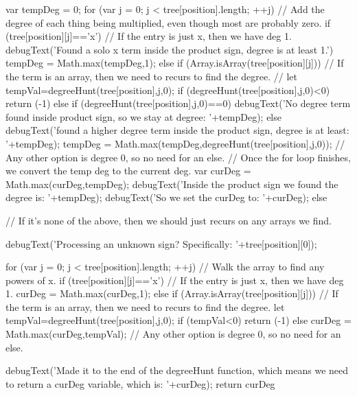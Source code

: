 \documentclass{ximera}
\begin{document}
\begin{javascript}
{{        var tempDeg = 0;
        for (var j = 0; j < tree[position].length; ++j) {
            // Add the degree of each thing being multiplied, even though most are probably zero.
            if (tree[position][j]=='x') {
                // If the entry is just x, then we have deg 1.
                debugText('Found a solo x term inside the product sign, degree is at least 1.')
                tempDeg = Math.max(tempDeg,1);
            } else if (Array.isArray(tree[position][j])) {
                // If the term is an array, then we need to recurs to find the degree.
                // let tempVal=degreeHunt(tree[position],j,0);
                if (degreeHunt(tree[position],j,0)<0) {
                    return (-1)
                } else if (degreeHunt(tree[position],j,0)==0){
                    debugText('No degree term found inside product sign, so we stay at degree: '+tempDeg);
                } else {
                    debugText('found a higher degree term inside the product sign, degree is at least: '+tempDeg);
                    tempDeg = Math.max(tempDeg,degreeHunt(tree[position],j,0));
                }
            }// Any other option is degree 0, so no need for an else.
        }
        // Once the for loop finishes, we convert the temp deg to the current deg.
        var curDeg = Math.max(curDeg,tempDeg);
        debugText('Inside the product sign we found the degree is: '+tempDeg);
        debugText('So we set the curDeg to: '+curDeg);
    } else {
        // If it's none of the above, then we should just recurs on any arrays we find.
         
        debugText('Processing an unknown sign? Specifically: '+tree[position][0]);
         
        for (var j = 0; j < tree[position].length; ++j) {
            // Walk the array to find any powers of x.
            if (tree[position][j]=='x') {
                // If the entry is just x, then we have deg 1.
                curDeg = Math.max(curDeg,1);
            } else if (Array.isArray(tree[position][j])) {
                // If the term is an array, then we need to recurs to find the degree.
                let tempVal=degreeHunt(tree[position],j,0);
                if (tempVal<0) { return (-1)} else {
                    curDeg = Math.max(curDeg,tempVal);
                }
            }// Any other option is degree 0, so no need for an else.
        }
         
    }
    debugText('Made it to the end of the degreeHunt function, which means we need to return a curDeg variable, which is: '+curDeg);
    return curDeg
}
 

\end{javascript}
\end{document}
